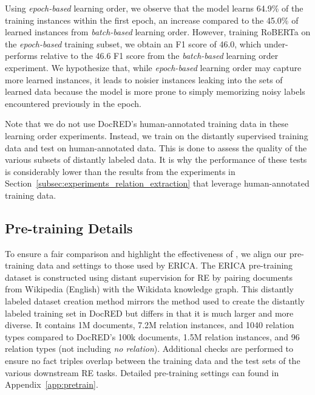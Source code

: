 Using \textit{epoch-based} learning order, we observe that the model learns 64.9\% of the training instances within the first epoch, an increase compared to the 45.0\% of learned instances from \textit{batch-based} learning order. However, training RoBERTa on the \textit{epoch-based} training subset, we obtain an F1 score of 46.0, which under-performs relative to the 46.6 F1 score from the \textit{batch-based} learning order experiment. We hypothesize that, while \textit{epoch-based} learning order may capture more learned instances, it leads to noisier instances leaking into the sets of learned data because the model is more prone to simply memorizing noisy labels encountered previously in the epoch. 

Note that we do not use DocRED's human-annotated training data in these learning order experiments. Instead, we train on the distantly supervised training data and test on human-annotated data. This is done to assess the quality of the various subsets of distantly labeled data. It is why the performance of these tests is considerably lower than the results from the experiments in Section~\ref{subsec:experiments_relation_extraction} that leverage human-annotated training data.


\subsection{Pre-training Details}
To ensure a fair comparison and highlight the effectiveness of \our, we align our pre-training data and settings to those used by ERICA. The ERICA pre-training dataset is constructed using distant supervision for RE by pairing documents from Wikipedia (English) with the Wikidata knowledge graph. This distantly labeled dataset creation method mirrors the method used to create the distantly labeled training set in DocRED but differs in that it is much larger and more diverse. It contains 1M documents, 7.2M relation instances, and 1040 relation types compared to DocRED's 100k documents, 1.5M relation instances, and 96 relation types (not including \textit{no relation}). Additional checks are performed to ensure no fact triples overlap between the training data and the test sets of the various downstream RE tasks. Detailed pre-training settings can found in Appendix~\ref{app:pretrain}.



